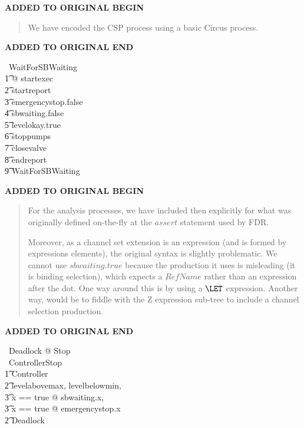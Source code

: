 \documentclass{report}
\newenvironment{addedstuff}{\begin{flushleft}\textbf{ADDED TO ORIGINAL BEGIN}\begin{quote}\begin{minipage}{.8\textwidth}}{\end{minipage}\end{quote}\textbf{ADDED TO ORIGINAL END}\end{flushleft}}
\begin{document}
\begin{addedstuff}
   We have encoded the CSP process using a basic Circus process.
\end{addedstuff}
\begin{circus}
   \circprocess\ WaitForSBWaiting \circdef \circbegin \\
   \t1 @ startexec \then \\
        \t2 startreport \then \\
            \t3 emergencystop.false \then \\
                \t4 sbwaiting.false \then \\
                    \t5 levelokay.true \then \\
                        \t6 stoppumps \then \\
                            \t7 closevalve \then \\
                                \t8 endreport \then \\
                                    \t9 WaitForSBWaiting \\
   \circend
\end{circus}

\begin{addedstuff}
   For the analysis processes, we have included then explicitly for
   what was originally defined on-the-fly at the $assert$ statement
   used by FDR.

   Moreover, as a channel set extension is an expression (and is formed by expressions elements),
   the original syntax is slightly problematic. We cannot use $sbwaiting.true$ because the production
   it uses is misleading (it is binding selection), which expects a $RefName$ rather than an expression
   after the dot. One way around this is by using a $\LET$ expression. Another way, would be to
   fiddle with the Z expression sub-tree to include a channel selection production.
\end{addedstuff}

\begin{circus}
   \circprocess\ Deadlock \circdef \circbegin @ Stop \circend \\
   \circprocess\ ControllerStop \circdef \\
        \t1 Controller \\
            \t2 \lpar \lchanset levelabovemax, levelbelowmin, \\
                            \t3  \LET x == true @ sbwaiting.x, \\
                            \t3  \LET x == true @ emergencystop.x \rchanset \rpar \\
        \t2 Deadlock %
\end{circus}
\end{document}
